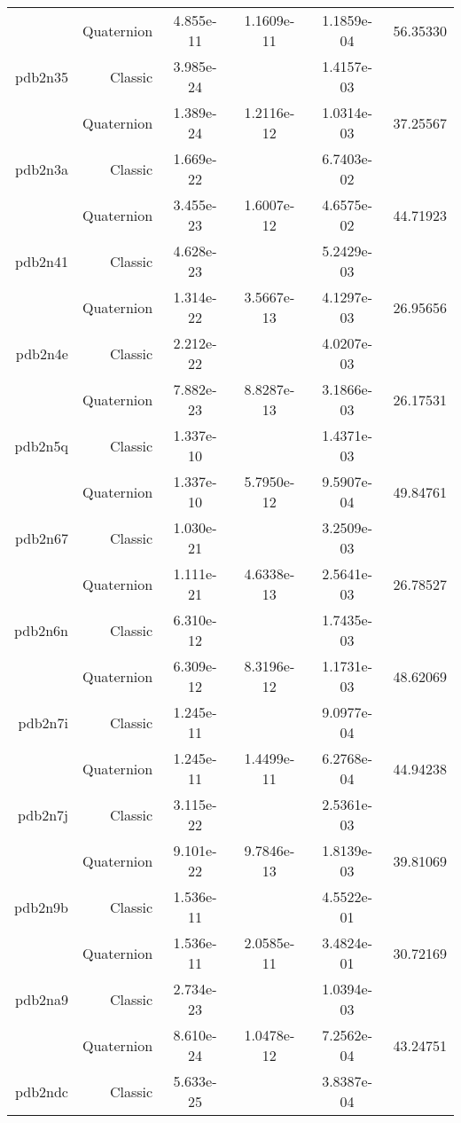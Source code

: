 \begin{xltabular}{\textwidth}{r|rS[table-format=1.3e+2]S[table-format=1.4e+2]S[table-format=1.4e+2]S[table-format=-1.5]}
& Quaternion & 4.855e-11 & 1.1609e-11 & 1.1859e-04 & 56.35330\\  \addlinespace
pdb2n35 & Classic & 3.985e-24 &  & 1.4157e-03 & \\
& Quaternion & 1.389e-24 & 1.2116e-12 & 1.0314e-03 & 37.25567\\  \addlinespace
pdb2n3a & Classic & 1.669e-22 &  & 6.7403e-02 & \\
& Quaternion & 3.455e-23 & 1.6007e-12 & 4.6575e-02 & 44.71923\\  \addlinespace
pdb2n41 & Classic & 4.628e-23 &  & 5.2429e-03 & \\
& Quaternion & 1.314e-22 & 3.5667e-13 & 4.1297e-03 & 26.95656\\  \addlinespace
pdb2n4e & Classic & 2.212e-22 &  & 4.0207e-03 & \\
& Quaternion & 7.882e-23 & 8.8287e-13 & 3.1866e-03 & 26.17531\\  \addlinespace
pdb2n5q & Classic & 1.337e-10 &  & 1.4371e-03 & \\
& Quaternion & 1.337e-10 & 5.7950e-12 & 9.5907e-04 & 49.84761\\  \addlinespace
pdb2n67 & Classic & 1.030e-21 &  & 3.2509e-03 & \\
& Quaternion & 1.111e-21 & 4.6338e-13 & 2.5641e-03 & 26.78527\\  \addlinespace
pdb2n6n & Classic & 6.310e-12 &  & 1.7435e-03 & \\
& Quaternion & 6.309e-12 & 8.3196e-12 & 1.1731e-03 & 48.62069\\  \addlinespace
pdb2n7i & Classic & 1.245e-11 &  & 9.0977e-04 & \\
& Quaternion & 1.245e-11 & 1.4499e-11 & 6.2768e-04 & 44.94238\\  \addlinespace
pdb2n7j & Classic & 3.115e-22 &  & 2.5361e-03 & \\
& Quaternion & 9.101e-22 & 9.7846e-13 & 1.8139e-03 & 39.81069\\  \addlinespace
pdb2n9b & Classic & 1.536e-11 &  & 4.5522e-01 & \\
& Quaternion & 1.536e-11 & 2.0585e-11 & 3.4824e-01 & 30.72169\\  \addlinespace
pdb2na9 & Classic & 2.734e-23 &  & 1.0394e-03 & \\
& Quaternion & 8.610e-24 & 1.0478e-12 & 7.2562e-04 & 43.24751\\  \addlinespace
pdb2ndc & Classic & 5.633e-25 &  & 3.8387e-04 & \\

\end{xltabular}
